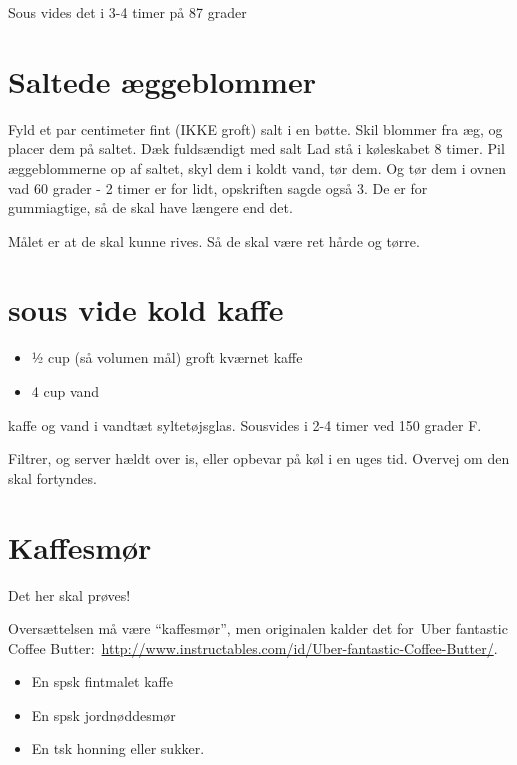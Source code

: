 \documentclass[
]{book}
\providecommand{\tightlist}{%
  \setlength{\itemsep}{0pt}\setlength{\parskip}{0pt}}
\begin{document}
Sous vides det i 3-4 timer på 87 grader

\hypertarget{saltede-uxe6ggeblommer}{%
\section{Saltede æggeblommer}\label{saltede-uxe6ggeblommer}}

Fyld et par centimeter fint (IKKE groft) salt i en bøtte.
Skil blommer fra æg, og placer dem på saltet. Dæk fuldsændigt med salt
Lad stå i køleskabet 8 timer.
Pil æggeblommerne op af saltet, skyl dem i koldt vand, tør dem. Og
tør dem i ovnen vad 60 grader - 2 timer er for lidt, opskriften sagde også 3.
De er for gummiagtige, så de skal have længere end det.

Målet er at de skal kunne rives. Så de skal være ret hårde og tørre.

\hypertarget{sous-vide-kold-kaffe}{%
\section{sous vide kold kaffe}\label{sous-vide-kold-kaffe}}

\begin{itemize}
\tightlist
\item
  ½ cup (så volumen mål) groft kværnet kaffe
\item
  4 cup vand
\end{itemize}

kaffe og vand i vandtæt syltetøjsglas. Sousvides i 2-4 timer ved 150 grader F.

Filtrer, og server hældt over is, eller opbevar på køl i en uges tid.
Overvej om den skal fortyndes.

\hypertarget{kaffesmuxf8r}{%
\section{Kaffesmør}\label{kaffesmuxf8r}}

Det her skal prøves!~

Oversættelsen må være ``kaffesmør'', men originalen kalder det for~Uber fantastic Coffee Butter:~\url{http://www.instructables.com/id/Uber-fantastic-Coffee-Butter/}.

\begin{itemize}
\tightlist
\item
  En spsk fintmalet kaffe
\item
  En spsk jordnøddesmør
\item
  En tsk honning eller sukker.
\end{itemize}
\end{document}
